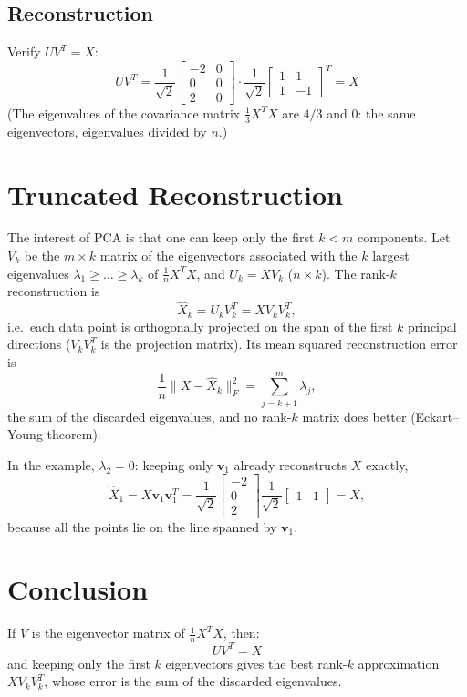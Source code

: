\begin{notechapter}
\subsection{Reconstruction}
Verify \( UV^T = X \):
\[
  UV^T = \frac{1}{\sqrt{2}}\begin{bmatrix}
    -2 & 0 \\
    0 & 0 \\
    2 & 0
  \end{bmatrix} \cdot \frac{1}{\sqrt{2}}\begin{bmatrix}
    1 & 1 \\
    1 & -1
  \end{bmatrix}^T = X
\]
(The eigenvalues of the covariance matrix $\frac{1}{3}X^TX$ are $4/3$ and $0$: the same eigenvectors, eigenvalues divided by $n$.)

\section{Truncated Reconstruction}
The interest of PCA is that one can keep only the first $k < m$ components. Let $V_k$ be the
$m\times k$ matrix of the eigenvectors associated with the $k$ largest eigenvalues
$\lambda_1 \geq \dots \geq \lambda_k$ of $\frac{1}{n}X^TX$, and $U_k = XV_k$ ($n\times k$). The
rank-$k$ reconstruction is
\[
  \hat{X}_k = U_k V_k^T = X V_k V_k^T ,
\]
i.e.\ each data point is orthogonally projected on the span of the first $k$ principal
directions ($V_kV_k^T$ is the projection matrix). Its mean squared reconstruction error is
\[
  \frac{1}{n}\big\|X - \hat{X}_k\big\|_F^2 = \sum_{j=k+1}^{m} \lambda_j ,
\]
the sum of the discarded eigenvalues, and no rank-$k$ matrix does better (Eckart--Young theorem).

In the example, $\lambda_2 = 0$: keeping only $\bm{v}_1$ already reconstructs $X$ exactly,
\[
  \hat{X}_1 = X\bm{v}_1\bm{v}_1^T = \frac{1}{\sqrt{2}}\begin{bmatrix} -2 \\ 0 \\ 2 \end{bmatrix} \frac{1}{\sqrt{2}}\begin{bmatrix} 1 & 1 \end{bmatrix} = X ,
\]
because all the points lie on the line spanned by $\bm{v}_1$.

\section{Conclusion}
If \( V \) is the eigenvector matrix of \( \frac{1}{n}X^T X \), then:
\[
    \boxed{UV^T = X}
\]
and keeping only the first $k$ eigenvectors gives the best rank-$k$ approximation $XV_kV_k^T$, whose error is the sum of the discarded eigenvalues.
\end{notechapter}
